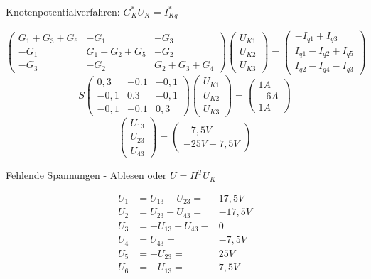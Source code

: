 \documentclass[german]{article}
\begin{document}
Knotenpotentialverfahren: $G_K^* U_K = I_{Kq}^*$

\[
	\begin{pmatrix}
		G_1 + G_3 + G_6 & -G_1 & -G_3 \\
		-G_1 & G_1 + G_2 + G_5 & -G_2 \\
		-G_3 & -G_2 & G_2 + G_3 + G_4
	\end{pmatrix}
	\begin{pmatrix}
		U_{K1} \\
		U_{K2} \\
		U_{K3}
	\end{pmatrix}
	=
	\begin{pmatrix}
		-I_{q1} + I_{q3} \\
		I_{q1} - I_{q2} + I_{q5} \\
		I_{q2} - I_{q4} - I_{q3}
	\end{pmatrix}
\]
\[
	S \begin{pmatrix}
		0,3 & -0.1 & -0,1 \\
		-0,1 & 0.3 & -0,1 \\
		-0,1 & -0.1 & 0,3
	\end{pmatrix}
	\begin{pmatrix}
		U_{K1} \\
		U_{K2} \\
		U_{K3}
	\end{pmatrix}
	=
	\begin{pmatrix}
		1 A \\
		-6 A \\
		1 A
	\end{pmatrix}
\]
\[
	\begin{pmatrix}
		U_{13} \\
		U_{23} \\
		U_{43}
	\end{pmatrix}
	=
	\begin{pmatrix}
		-7,5 V \\
		-25 V
		-7,5 V
	\end{pmatrix}
\]

Fehlende Spannungen - Ablesen oder $U = H^T U_K$


\begin{eqnarray*}
	U_1 & = U_{13} - U_{23} = & 17,5V \\
	U_2 & = U_{23} - U_{43} = & -17,5V \\
	U_3 & = - U_{13} + U_{43} - & 0 \\
	U_4 & = U_{43} = & -7,5 V \\
	U_5 & = - U_{23} = & 25V \\
	U_6 & = - U_{13} = & 7,5V
\end{eqnarray*}
\end{document}
